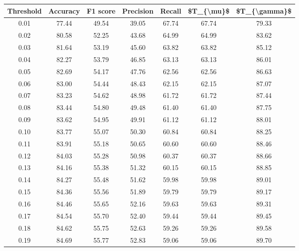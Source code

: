 \begin{tabular}{|c|c|c|c|c|c|c|}
\hline
 Threshold &  Accuracy &  F1 score &  Precision &  Recall &  \$T\_\{\textbackslash mu\}\$ &  \$T\_\{\textbackslash gamma\}\$ \\
\hline
      0.01 &     77.44 &     49.54 &      39.05 &   67.74 &      67.74 &         79.33 \\
      0.02 &     80.58 &     52.25 &      43.68 &   64.99 &      64.99 &         83.62 \\
      0.03 &     81.64 &     53.19 &      45.60 &   63.82 &      63.82 &         85.12 \\
      0.04 &     82.27 &     53.79 &      46.85 &   63.13 &      63.13 &         86.01 \\
      0.05 &     82.69 &     54.17 &      47.76 &   62.56 &      62.56 &         86.63 \\
      0.06 &     83.00 &     54.44 &      48.43 &   62.15 &      62.15 &         87.07 \\
      0.07 &     83.23 &     54.62 &      48.98 &   61.72 &      61.72 &         87.44 \\
      0.08 &     83.44 &     54.80 &      49.48 &   61.40 &      61.40 &         87.75 \\
      0.09 &     83.62 &     54.95 &      49.91 &   61.12 &      61.12 &         88.01 \\
      0.10 &     83.77 &     55.07 &      50.30 &   60.84 &      60.84 &         88.25 \\
      0.11 &     83.91 &     55.18 &      50.65 &   60.60 &      60.60 &         88.46 \\
      0.12 &     84.03 &     55.28 &      50.98 &   60.37 &      60.37 &         88.66 \\
      0.13 &     84.16 &     55.38 &      51.32 &   60.15 &      60.15 &         88.85 \\
      0.14 &     84.27 &     55.48 &      51.62 &   59.98 &      59.98 &         89.01 \\
      0.15 &     84.36 &     55.56 &      51.89 &   59.79 &      59.79 &         89.17 \\
      0.16 &     84.46 &     55.65 &      52.16 &   59.63 &      59.63 &         89.31 \\
      0.17 &     84.54 &     55.70 &      52.40 &   59.44 &      59.44 &         89.45 \\
      0.18 &     84.62 &     55.75 &      52.63 &   59.26 &      59.26 &         89.58 \\
      0.19 &     84.69 &     55.77 &      52.83 &   59.06 &      59.06 &         89.70 \\

\end{tabular}
